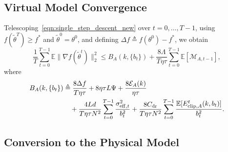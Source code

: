 \documentclass[journal]{IEEEtran}
\begin{document}
\subsection{Virtual Model Convergence}

Telescoping~\eqref{eqn:single_step_descent_new} over $t=0,\ldots,T-1$, using $f(\tilde\theta^T)\ge f^*$ and $\tilde\theta^0=\theta^0$, and defining $\Delta f\triangleq f(\theta^0)-f^*$, we obtain
\begin{equation}
    \label{eqn:virtual_bound_with_memory}
    \frac1T\sum_{t=0}^{T-1}\mathbb{E}\|\nabla f(\tilde\theta^t)\|_2^2
    \le
    B_A(k,\{b_t\})+
    \frac{8\Lambda}{T\eta\tau}\sum_{t=0}^{T-1}\mathbb{E}[\mathcal{M}_{A,t-1}],
\end{equation}
where
\begin{align}
    B_A(k,\{b_t\})
    &\triangleq
    \frac{8\Delta f}{T\eta\tau}
    +8\eta\tau L\Psi
    +\frac{8\mathcal{E}_A(k)}{\eta\tau}
    \notag\\
    &\quad+
    \frac{4Ld}{T\eta\tau N^2}\sum_{t=0}^{T-1}\frac{\sigma_{\mathrm{eff},t}^2}{b_t^2}
    +
    \frac{8C_{\mathrm{dr}}}{T\eta\tau N^2}
    \sum_{t=0}^{T-1}
    \frac{\mathbb{E}[E_{\mathrm{clip},A}^t(k,b_t)]}{b_t^2}.
\end{align}


\subsection{Conversion to the Physical Model}
\end{document}
